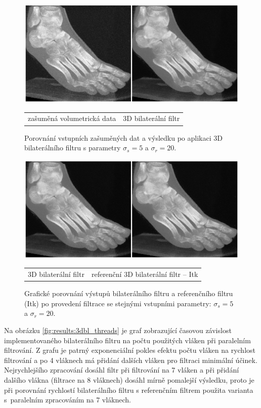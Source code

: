 \begin{figure} [H]
    \centering
    \label{fig:results:3dbl_vs_noisy}
    \includegraphics[width=1\textwidth]{figures/3dbl_vs_noisy.png}
    \begin{tabularx}{1\textwidth}{>{\centering}X>{\centering}X}
        zašuměná volumetrická data & 3D bilaterální filtr
    \end{tabularx}
    \caption{Porovnání vstupních zašuměných dat a výsledku po aplikaci 3D bilaterálního filtru s parametry $\sigma_s = 5$ a $\sigma_r = 20$.}
\end{figure}

\begin{figure} [H]
    \centering
    \label{fig:results:3dbl_vs_itk}
    \includegraphics[width=1\textwidth]{figures/3dbl_vs_itk.png}
    \begin{tabularx}{1\textwidth}{>{\centering}X>{\centering}X}
        3D bilaterální filtr & referenční 3D bilaterální filtr -- Itk
    \end{tabularx}
    \caption{Grafické porovnání výstupů bilaterálního filtru a referenčního filtru (Itk) po provedení filtrace se stejnými vstupními parametry: $\sigma_s = 5$ a $\sigma_r = 20$.}
\end{figure}

Na obrázku \ref{fig:results:3dbl_threads} je graf zobrazující časovou závislost implementovaného bilaterálního filtru na počtu použitých vláken při paralelním filtrování. Z grafu je patrný exponenciální pokles efektu počtu vláken na rychlost filtrování a po 4 vláknech má přidání dalších vláken pro filtraci minimální účinek. Nejrychlejšího zpracování dosáhl filtr při filtrování na 7 vláken a při přidání dalšího vlákna (filtrace na 8 vláknech) dosáhl mírně pomalejší výsledku, proto je při porovnání rychlostí bilaterálního filtru s referenčním filtrem použita varianta s~paralelním zpracováním na 7 vláknech.

